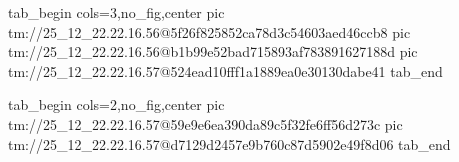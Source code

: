  
 
 
 
 

\qqSecCmtScr


\ifcmt
  tab_begin cols=3,no_fig,center
    pic tm://25_12_22.22.16.56@5f26f825852ca78d3c54603aed46ccb8
    pic tm://25_12_22.22.16.56@b1b99e52bad715893af783891627188d
    pic tm://25_12_22.22.16.57@524ead10fff1a1889ea0e30130dabe41
  tab_end
\fi


\ifcmt
  tab_begin cols=2,no_fig,center
    pic tm://25_12_22.22.16.57@59e9e6ea390da89c5f32fe6ff56d273c
    pic tm://25_12_22.22.16.57@d7129d2457e9b760c87d5902e49f8d06
  tab_end
\fi

